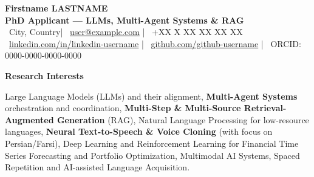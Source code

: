 \documentclass[11pt,a4paper]{article}
\makeatletter
\newcommand{\itemspace}{\vspace{0.4em}}
\newcommand{\sectionspace}{\itemspace}
\newcommand{\cvsection}[1]{
    \sectionspace
    \noindent\textcolor{primary}{\Large \textbf{#1}} \textcolor{primary}{\hrulefill}
    \par\vspace{0.4em}
}
\providecommand{\cvname}{Firstname LASTNAME}
\providecommand{\cvemail}{user@example.com}
\providecommand{\cvphone}{+XX X XX XX XX XX}
\providecommand{\cvlocation}{City, Country}
\providecommand{\cvgithub}{github-username}
\providecommand{\cvlinkedin}{linkedin-username}
\providecommand{\cvorcid}{0000-0000-0000-0000}
\makeatother
\begin{document}
\begin{center}
    {\huge \textcolor{primary}{\textbf{\cvname}}}\\
    \vspace{0.1cm}
    \textcolor{primary}{\textbf{PhD Applicant — LLMs, Multi-Agent Systems \& RAG}}\\
    \vspace{0.2cm}
    \textcolor{primary}{\faMapMarker*} \ \cvlocation \quad|\quad
    \textcolor{primary}{\faEnvelope} \ \href{mailto:\cvemail}{\cvemail} \quad|\quad
    \textcolor{primary}{\faPhone} \ \cvphone \\
    \vspace{0.1cm}
    \textcolor{primary}{\faLinkedin} \ \href{https://linkedin.com/in/\cvlinkedin}{linkedin.com/in/\cvlinkedin} \quad|\quad
    \textcolor{primary}{\faGithub} \ \href{https://github.com/\cvgithub}{github.com/\cvgithub} \quad|\quad
    \textcolor{primary}{\faGlobe} \ ORCID: \cvorcid
\end{center}

\cvsection{Research Interests}
\noindent
Large Language Models (LLMs) and their alignment, \textbf{Multi-Agent Systems} orchestration and coordination, \textbf{Multi-Step \& Multi-Source Retrieval-Augmented Generation} (RAG), Natural Language Processing for low-resource languages, \textbf{Neural Text-to-Speech \& Voice Cloning} (with focus on Persian/Farsi), Deep Learning and Reinforcement Learning for Financial Time Series Forecasting and Portfolio Optimization, Multimodal AI Systems, Spaced Repetition and AI-assisted Language Acquisition.
\end{document}
